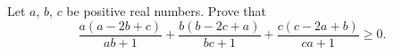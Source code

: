 Let $a$, $b$, $c$ be positive real numbers. Prove that
\[\dfrac{a(a-2b+c)}{ab+1}+\dfrac{b(b-2c+a)}{bc+1}+\dfrac{c(c-2a+b)}{ca+1}\ge0.\]
